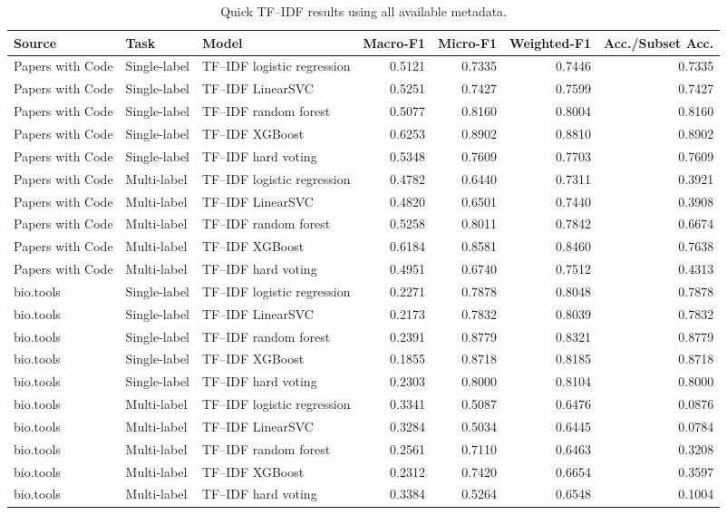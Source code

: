 \begin{table}[htbp]
\centering
\scriptsize
\caption{Quick TF--IDF results using all available metadata.}
\label{tab:tfidf-all-available-quick-results}
\begin{tabular}{lllrrrr}
\toprule
Source & Task & Model & Macro-F1 & Micro-F1 & Weighted-F1 & Acc./Subset Acc. \\
\midrule
Papers with Code & Single-label & TF--IDF logistic regression & 0.5121 & 0.7335 & 0.7446 & 0.7335 \\
Papers with Code & Single-label & TF--IDF LinearSVC & 0.5251 & 0.7427 & 0.7599 & 0.7427 \\
Papers with Code & Single-label & TF--IDF random forest & 0.5077 & 0.8160 & 0.8004 & 0.8160 \\
Papers with Code & Single-label & TF--IDF XGBoost & 0.6253 & 0.8902 & 0.8810 & 0.8902 \\
Papers with Code & Single-label & TF--IDF hard voting & 0.5348 & 0.7609 & 0.7703 & 0.7609 \\
Papers with Code & Multi-label & TF--IDF logistic regression & 0.4782 & 0.6440 & 0.7311 & 0.3921 \\
Papers with Code & Multi-label & TF--IDF LinearSVC & 0.4820 & 0.6501 & 0.7440 & 0.3908 \\
Papers with Code & Multi-label & TF--IDF random forest & 0.5258 & 0.8011 & 0.7842 & 0.6674 \\
Papers with Code & Multi-label & TF--IDF XGBoost & 0.6184 & 0.8581 & 0.8460 & 0.7638 \\
Papers with Code & Multi-label & TF--IDF hard voting & 0.4951 & 0.6740 & 0.7512 & 0.4313 \\
bio.tools & Single-label & TF--IDF logistic regression & 0.2271 & 0.7878 & 0.8048 & 0.7878 \\
bio.tools & Single-label & TF--IDF LinearSVC & 0.2173 & 0.7832 & 0.8039 & 0.7832 \\
bio.tools & Single-label & TF--IDF random forest & 0.2391 & 0.8779 & 0.8321 & 0.8779 \\
bio.tools & Single-label & TF--IDF XGBoost & 0.1855 & 0.8718 & 0.8185 & 0.8718 \\
bio.tools & Single-label & TF--IDF hard voting & 0.2303 & 0.8000 & 0.8104 & 0.8000 \\
bio.tools & Multi-label & TF--IDF logistic regression & 0.3341 & 0.5087 & 0.6476 & 0.0876 \\
bio.tools & Multi-label & TF--IDF LinearSVC & 0.3284 & 0.5034 & 0.6445 & 0.0784 \\
bio.tools & Multi-label & TF--IDF random forest & 0.2561 & 0.7110 & 0.6463 & 0.3208 \\
bio.tools & Multi-label & TF--IDF XGBoost & 0.2312 & 0.7420 & 0.6654 & 0.3597 \\
bio.tools & Multi-label & TF--IDF hard voting & 0.3384 & 0.5264 & 0.6548 & 0.1004 \\
\bottomrule
\end{tabular}
\end{table}
